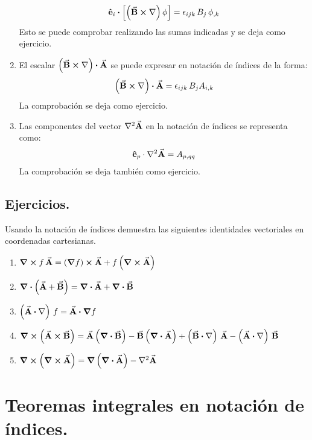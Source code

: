 \documentclass[hidelinks,12pt]{article}
\begin{document}
\begin{enumerate}
\begin{align*}
\vu{e}_{i} \vdot \left[ \left( \va{B} \cross \nabla \right) \phi \right] = \epsilon_{ijk} \, B_{j} \, \phi_{,k}
\end{align*}
Esto se puede comprobar realizando las sumas indicadas y se deja como ejercicio.
\item El escalar $\left( \va{B} \cross \nabla \right) \vdot \va{A}$ se puede expresar en notación de índices de la forma:
\begin{align*}
\left( \va{B} \cross \nabla \right) \vdot \va{A} = \epsilon_{ijk} \, B_{j} A_{i,k}
\end{align*}
La comprobación se deja como ejercicio.
\item Las componentes del vector $\laplacian{\va{A}}$ en la notación de índices se representa como:
\begin{align*}
\vu{e}_{p} \cdot \laplacian{\va{A}} = A_{p, qq}
\end{align*}
La comprobación se deja también como ejercicio.
\end{enumerate}

\subsection{Ejercicios.}

Usando la notación de índices demuestra las siguientes identidades vectoriales en coordenadas cartesianas.

\begin{enumerate}[label=\roman*)]
\item $\curl{f \, \va{A}} = \left( \grad{f} \right) \cross \va{A} + f \left( \curl{\va{A}} \right)$
\item $\divergence{\left( \va{A} + \va{B} \right)} = \divergence{\va{A}} + \divergence{\va{B}}$
\item $\left( \va{A} \vdot \nabla \right) \, f = \va{A} \vdot \grad{f}$
\item $\curl{\left( \va{A} \cross \va{B} \right)} = \va{A} \left( \divergence{\va{B}} \right) - \va{B} \left( \divergence{\va{A}} \right) + \left( \va{B} \vdot \nabla \right) \, \va{A} - \left( \va{A} \vdot \nabla \right) \, \va{B}$
\item $\curl{\left( \curl{\va{A}} \right)} = \grad{\left( \divergence{\va{A}} \right)} - \laplacian{\va{A}}$
\end{enumerate}

\section{Teoremas integrales en notación de índices.}
\end{document}
